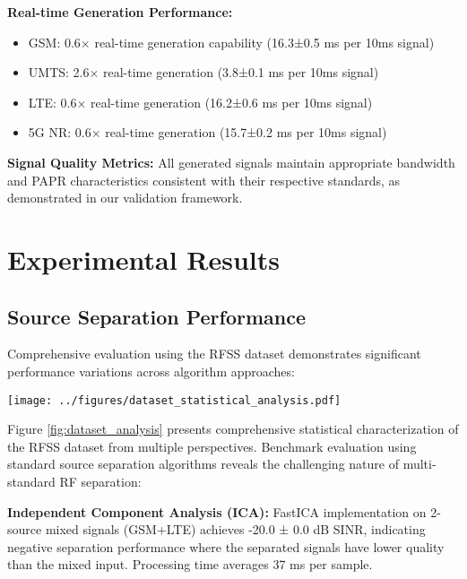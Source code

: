 \documentclass[twocolumn]{article}
\begin{document}
\textbf{Real-time Generation Performance:}
\begin{itemize}
\item GSM: 0.6× real-time generation capability (16.3±0.5 ms per 10ms signal)
\item UMTS: 2.6× real-time generation (3.8±0.1 ms per 10ms signal)
\item LTE: 0.6× real-time generation (16.2±0.6 ms per 10ms signal)
\item 5G NR: 0.6× real-time generation (15.7±0.2 ms per 10ms signal)
\end{itemize}

\textbf{Signal Quality Metrics:}
All generated signals maintain appropriate bandwidth and PAPR characteristics consistent with their respective standards, as demonstrated in our validation framework.

\section{Experimental Results}

\subsection{Source Separation Performance}

Comprehensive evaluation using the RFSS dataset demonstrates significant performance variations across algorithm approaches:

\begin{figure*}[t]
\centering
\texttt{[image: ../figures/dataset\_statistical\_analysis.pdf]}
\caption{Comprehensive statistical characterization of the RFSS dataset showing multi-perspective analysis including PAPR distributions, bandwidth utilization, amplitude characteristics, power spectral density comparisons, signal quality metrics, and dataset composition overview.}
\label{fig:dataset_analysis}
\end{figure*}

Figure \ref{fig:dataset_analysis} presents comprehensive statistical characterization of the RFSS dataset from multiple perspectives. Benchmark evaluation using standard source separation algorithms reveals the challenging nature of multi-standard RF separation:

\textbf{Independent Component Analysis (ICA):} FastICA implementation on 2-source mixed signals (GSM+LTE) achieves -20.0 ± 0.0 dB SINR, indicating negative separation performance where the separated signals have lower quality than the mixed input. Processing time averages 37 ms per sample.
\end{document}
